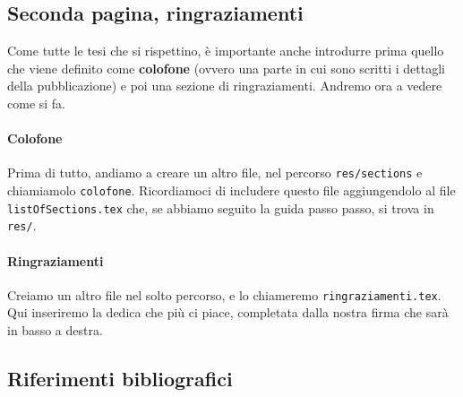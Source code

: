 \subsection{Seconda pagina, ringraziamenti}
Come tutte le tesi che si rispettino, è importante anche introdurre prima
quello che viene definito come \textbf{colofone} (ovvero una parte in cui sono
scritti i dettagli della pubblicazione) e poi una sezione di ringraziamenti.
Andremo ora a vedere come si fa.
\paragraph*{Colofone} Prima di tutto, andiamo a creare un altro
file, nel percorso \texttt{res/sections} e chiamiamolo \texttt{colofone}.
Ricordiamoci di includere questo file aggiungendolo al file
\texttt{listOfSections.tex} che, se abbiamo seguito la guida passo passo, si
trova in \texttt{res/}.



\paragraph*{Ringraziamenti} Creiamo un altro file nel solto percorso, e lo
chiameremo \texttt{ringraziamenti.tex}. Qui inseriremo la dedica che più ci
piace, completata dalla nostra firma che sarà in basso a destra.



\subsection{Riferimenti bibliografici}
